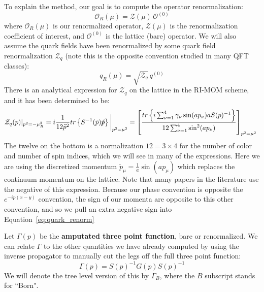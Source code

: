 \documentclass[11pt, oneside]{article}   	%
\theoremstyle{definition}
\begin{document}
To explain the method, our goal is to compute the operator renormalization:
\begin{equation}
	\mathcal O_R(\mu) = \mathcal Z(\mu) \,\mathcal O^{(0)}
\end{equation}
where $\mathcal O_R(\mu)$ is our renormalized operator, $\mathcal Z(\mu)$ is the renormalization coefficient of 
interest, and $\mathcal O^{(0)}$ is the lattice (bare) operator. We will also assume the quark fields have been 
renormalized by some quark field renormalization $\mathcal Z_q$ (note this is the opposite convention studied in 
many QFT classes):
\begin{equation}
	q_R(\mu) = \sqrt{\mathcal Z_q}\,q^{(0)}
\end{equation}
There is an analytical expression for $\mathcal{Z}_q$ on the lattice in the RI-MOM scheme, and it has been determined 
to be:
\begin{equation}
	\mathcal Z_q(p)|_{p^2 = -\mu_R^2} = i\frac{1}{12\tilde p^2}tr\left\{S^{-1}(\tilde p)\slashed{\tilde p}\right\}\bigg|_{p^2 = \mu^2} = \left[\frac{tr\left\{i\sum_{\nu = 1}^4 \gamma_\nu \sin(ap_\nu) a S(p)^{-1}\right\}}{12\sum_{\nu = 1}^4 \sin^2(ap_\nu)}\right]_{p^2 = \mu^2}~
	\label{eq:quark_renorm}
\end{equation}
The twelve on the bottom is a normalization $12 = 3\times 4$ for the number of color and number of spin indices, which we will 
see in many of the expressions. Here we are using the discretized momentum $\tilde p_\mu = \frac{1}{a}\sin(a p_\mu)$ 
which replaces the continuum momentum on the lattice. Note that many papers in the literature use the negative of this 
expression. Because our phase convention is opposite the $e^{-ip(x - y)}$ convention, the sign of our momenta are opposite 
to this other convention, and so we pull an extra negative sign into Equation~\ref{eq:quark_renorm}

Let $\Gamma(p)$ be the \textbf{amputated three point function}, bare or renormalized. We can relate $\Gamma$ to the other 
quantities we have already computed by using the inverse propagator to manually cut the legs off the full three 
point function:
\begin{equation}
	\Gamma(p) = S(p)^{-1} G(p) S(p)^{-1}
\end{equation}
We will denote the tree level version of this by $\Gamma_B$, where the $B$ subscript stands for ``Born". 
\end{document}
